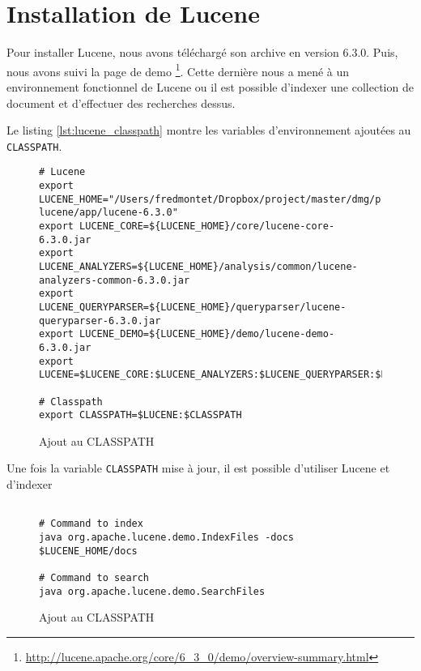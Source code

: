 \chapter{Installation de Lucene}

Pour installer Lucene, nous avons téléchargé son archive en version 6.3.0. Puis, nous avons suivi la page de demo \footnote{\url{http://lucene.apache.org/core/6_3_0/demo/overview-summary.html}}. Cette dernière nous a mené à un environnement fonctionnel de Lucene ou il est possible d'indexer une collection de document et d'effectuer des recherches dessus. 

Le listing \autoref{lst:lucene_classpath} montre les variables d'environnement ajoutées au \texttt{CLASSPATH}.

\begin{figure}[H]
\centering
\begin{lstlisting}	
# Lucene
export LUCENE_HOME="/Users/fredmontet/Dropbox/project/master/dmg/project/labs/lab03-lucene/app/lucene-6.3.0"
export LUCENE_CORE=${LUCENE_HOME}/core/lucene-core-6.3.0.jar
export LUCENE_ANALYZERS=${LUCENE_HOME}/analysis/common/lucene-analyzers-common-6.3.0.jar
export LUCENE_QUERYPARSER=${LUCENE_HOME}/queryparser/lucene-queryparser-6.3.0.jar
export LUCENE_DEMO=${LUCENE_HOME}/demo/lucene-demo-6.3.0.jar
export LUCENE=$LUCENE_CORE:$LUCENE_ANALYZERS:$LUCENE_QUERYPARSER:$LUCENE_DEMO

# Classpath
export CLASSPATH=$LUCENE:$CLASSPATH
\end{lstlisting}
\caption{Ajout au CLASSPATH}
\label{lst:lucene_classpath}
\end{figure}

Une fois la variable \texttt{CLASSPATH} mise à jour, il est possible d'utiliser Lucene et d'indexer 

\begin{figure}[H]
\centering
\begin{lstlisting}	

# Command to index
java org.apache.lucene.demo.IndexFiles -docs $LUCENE_HOME/docs

# Command to search
java org.apache.lucene.demo.SearchFiles 

\end{lstlisting}
\caption{Ajout au CLASSPATH}
\label{lst:lucene_classpath}
\end{figure}